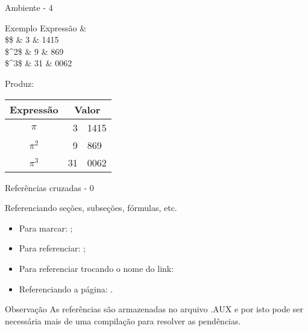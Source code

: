 \begin{frame}{Ambiente  - 4}
	\begin{Codigo}{Exemplo}
		\n
			Expressão \&  \string\\ \string\hline\n
			\$\string\pi\$ \& 3 \& 1415 \string\\ \n
			\$\string\pi\string^2\$ \& 9 \& 869 \string\\ \n
			\$\string\pi\string^3\$ \& 31 \& 0062 \n
	\end{Codigo}
	\pause
	Produz:

	\begin{Resultado}{}
		\begin{tabular}{c r @{,} l}
			Expressão & \multicolumn{2}{c}{Valor} \\ \hline
			$\pi$ & 3 & 1415 \\
			$\pi^2$ & 9 & 869 \\
			$\pi^3$ & 31 & 0062
		\end{tabular}
	\end{Resultado}
\end{frame}

\begin{frame}{Referências cruzadas - 0}
	\begin{Resultado}{Referenciando seções, subseções, fórmulas, etc.}
		\begin{itemize}
			\item Para marcar: ;
			\pause
			\item Para referenciar: ;
			\pause
			\item Para referenciar trocando o nome do link:
			\pause
			\item Referenciando a página: .
		\end{itemize}
	\end{Resultado}

    \pause
	\begin{Observacao}{Observação}
		As referências são armazenadas no arquivo .AUX e por isto pode ser necessária mais de uma compilação para resolver as pendências.
	\end{Observacao}
\end{frame}

